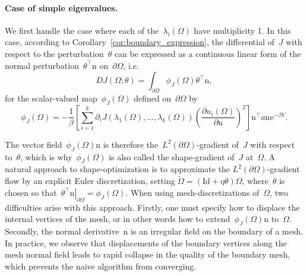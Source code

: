 \documentclass[a4]{article}
\newcommand{\e}{\mathrm{e}}
\newcommand{\n}{\mathrm{n}}
\newcommand{\1}{\mathbbm 1}
\newcommand{\Id}{\mathrm{Id}}
\begin{document}
\paragraph{Case of simple eigenvalues.}
We first handle the case where each of the~$\lambda_i(\Omega)$ have multiplicity 1.
In this case, according to Corollary~\ref{cor:boundary_expression}, the differential of~$J$ with respect to the perturbation~$\theta$ can be expressed as a continuous linear form of the normal perturbation~$\theta^\top\n$ on~$\partial\Omega$, i.e.
\begin{equation}
    D J(\Omega;\theta) = \int_{\partial\Omega}\phi_J(\Omega)\theta^\top\n,
\end{equation}
for the scalar-valued map~$\phi_J(\Omega)$ defined on~$\partial\Omega$ by
\begin{equation}
    \label{eq:shape_gradient_explicit}
    \phi_J(\Omega) = -\frac1\beta \left[\sum_{i=1}^k\partial_i J(\lambda_1(\Omega),\dots,\lambda_k(\Omega))\left(\frac{\partial u_i(\Omega)}{\partial\n}\right)^2\right]\n^\top a\n \e^{-\beta V}.
\end{equation}

The vector field~$\phi_J(\Omega) \n$ is therefore the~$L^2(\partial\Omega)$-gradient of~$J$ with respect to~$\theta$, which is why~$\phi_J(\Omega)$ is also called the shape-gradient of~$J$ at~$\Omega$.
A natural approach to shape-optimization is to approximate the $L^2(\partial\Omega)$-gradient flow by an explicit Euler discretization, setting $\widetilde\Omega = (\Id+\eta\theta)\Omega$, where~$\theta$ is chosen so that~$\left.\theta^\top\n\right|_{\partial\Omega}=\phi_J(\Omega)$.
When using mesh-discretizations of~$\Omega$, two difficulties arise with this approach. Firstly, one must specify how to displace the internal vertices of the mesh, or in other words how to extend~$\phi_J(\Omega)\n$ to~$\Omega$.
Secondly, the normal derivative~$\n$ is an irregular field on the boundary of a mesh. In practice, we observe that displacements of the boundary vertices along the mesh normal field leads to rapid collapse in the quality of the boundary mesh, which prevents the naive algorithm from converging.
\end{document}
